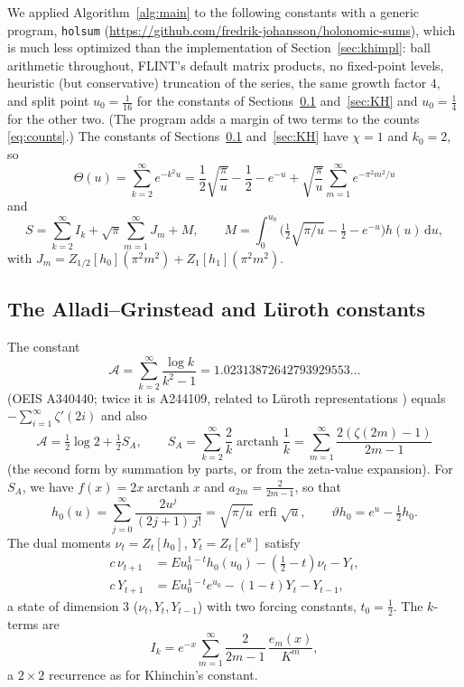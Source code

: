 \documentclass[11pt,reqno]{amsart}
\theoremstyle{definition}
\theoremstyle{remark}
\newcommand{\erfi}{\operatorname{erfi}}
\newcommand{\arctanh}{\operatorname{arctanh}}
\newcommand{\dd}{\,\mathrm{d}}
\begin{document}
We applied Algorithm~\ref{alg:main} to the following constants with a generic program, \texttt{holsum}
(\url{https://github.com/fredrik-johansson/holonomic-sums}), which is much less optimized than the implementation of Section~\ref{sec:khimpl}: ball arithmetic
throughout, FLINT's default matrix products, no fixed-point levels, heuristic (but conservative) truncation of the
series, the same growth factor $4$, and split point $u_0 = \frac1{16}$ for the constants of
Sections~\ref{sec:AG} and~\ref{sec:KH} and $u_0 = \frac14$ for the other two. (The program adds a margin of two terms
to the counts \eqref{eq:counts}.) The constants of Sections~\ref{sec:AG} and~\ref{sec:KH} have $\chi = 1$ and $k_0 = 2$, so
\[
  \Theta(u) = \sum_{k=2}^{\infty}e^{-k^2u} = \frac12\sqrt{\frac\pi u} - \frac12 - e^{-u} + \sqrt{\frac\pi u}\sum_{m=1}^{\infty}e^{-\pi^2m^2/u}
\]
and
\[
  S = \sum_{k=2}^{\infty} I_k + \sqrt\pi\sum_{m=1}^{\infty}J_m + M, \qquad
  M = \int_0^{u_0}\bigl(\tfrac12\sqrt{\pi/u} - \tfrac12 - e^{-u}\bigr)h(u)\dd u,
\]
with $J_m = Z_{1/2}[h_0](\pi^2m^2) + Z_1[h_1](\pi^2m^2)$.

\subsection{The Alladi--Grinstead and L\"uroth constants}\label{sec:AG}
The constant
\[
  \mathcal A = \sum_{k=2}^{\infty}\frac{\log k}{k^2-1} = 1.02313872642793929553\ldots
\]
(OEIS A340440; twice it is A244109, related to L\"uroth representations \cite{Kal88,Fin03}) equals
$-\sum_{i=1}^{\infty}\zeta'(2i)$ and also
\[
  \mathcal A = \tfrac12\log2 + \tfrac12 S_A, \qquad
  S_A = \sum_{k=2}^{\infty}\frac{2}{k}\arctanh\frac1k = \sum_{m=1}^{\infty}\frac{2(\zeta(2m)-1)}{2m-1}
\]
(the second form by summation by parts, or from the zeta-value expansion). For $S_A$, we have
$f(x) = 2x\arctanh x$ and $a_{2m} = \frac{2}{2m-1}$, so that
\[
  h_0(u) = \sum_{j=0}^{\infty}\frac{2u^j}{(2j+1)\,j!} = \sqrt{\pi/u}\,\erfi\sqrt u, \qquad \vartheta h_0 = e^u - \tfrac12h_0 .
\]
The dual moments $\nu_t = Z_t[h_0]$, $Y_t = Z_t[e^u]$ satisfy
\begin{align*}
  c\,\nu_{t+1} &= Eu_0^{1-t}h_0(u_0) - (\tfrac12 - t)\nu_t - Y_t, \\
  c\,Y_{t+1} &= Eu_0^{1-t}e^{u_0} - (1-t)Y_t - Y_{t-1},
\end{align*}
a state of dimension $3$ ($\nu_t, Y_t, Y_{t-1}$) with two forcing constants, $t_0 = \frac12$. The $k$-terms are
\[
  I_k = e^{-x}\sum_{m=1}^{\infty} \frac{2}{2m-1}\,\frac{e_m(x)}{K^m},
\]
a $2\times2$ recurrence as for Khinchin's constant.
\end{document}
